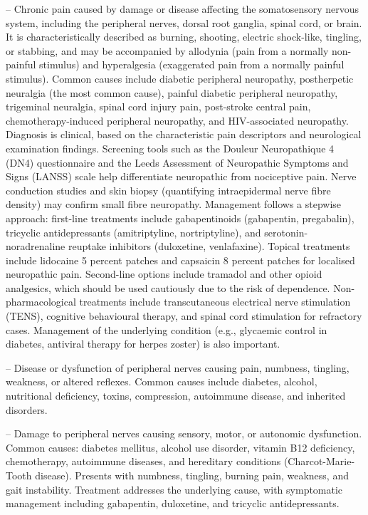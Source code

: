 -- Chronic pain caused by damage or disease affecting the somatosensory nervous system, including the peripheral nerves, dorsal root ganglia, spinal cord, or brain. It is characteristically described as burning, shooting, electric shock-like, tingling, or stabbing, and may be accompanied by allodynia (pain from a normally non-painful stimulus) and hyperalgesia (exaggerated pain from a normally painful stimulus). Common causes include diabetic peripheral neuropathy, postherpetic neuralgia (the most common cause), painful diabetic peripheral neuropathy, trigeminal neuralgia, spinal cord injury pain, post-stroke central pain, chemotherapy-induced peripheral neuropathy, and HIV-associated neuropathy. Diagnosis is clinical, based on the characteristic pain descriptors and neurological examination findings. Screening tools such as the Douleur Neuropathique 4 (DN4) questionnaire and the Leeds Assessment of Neuropathic Symptoms and Signs (LANSS) scale help differentiate neuropathic from nociceptive pain. Nerve conduction studies and skin biopsy (quantifying intraepidermal nerve fibre density) may confirm small fibre neuropathy. Management follows a stepwise approach: first-line treatments include gabapentinoids (gabapentin, pregabalin), tricyclic antidepressants (amitriptyline, nortriptyline), and serotonin-noradrenaline reuptake inhibitors (duloxetine, venlafaxine). Topical treatments include lidocaine 5 percent patches and capsaicin 8 percent patches for localised neuropathic pain. Second-line options include tramadol and other opioid analgesics, which should be used cautiously due to the risk of dependence. Non-pharmacological treatments include transcutaneous electrical nerve stimulation (TENS), cognitive behavioural therapy, and spinal cord stimulation for refractory cases. Management of the underlying condition (e.g., glycaemic control in diabetes, antiviral therapy for herpes zoster) is also important.

-- Disease or dysfunction of peripheral nerves causing pain, numbness, tingling, weakness, or altered reflexes. Common causes include diabetes, alcohol, nutritional deficiency, toxins, compression, autoimmune disease, and inherited disorders.

-- Damage to peripheral nerves causing sensory, motor, or autonomic dysfunction. Common causes: diabetes mellitus, alcohol use disorder, vitamin B12 deficiency, chemotherapy, autoimmune diseases, and hereditary conditions (Charcot-Marie-Tooth disease). Presents with numbness, tingling, burning pain, weakness, and gait instability. Treatment addresses the underlying cause, with symptomatic management including gabapentin, duloxetine, and tricyclic antidepressants.

